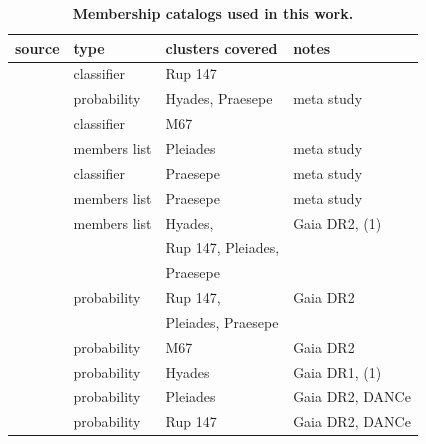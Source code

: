 \documentclass{aa}
\begin{document}
\begin{appendix}

\begin{table}
\caption{\textbf{Membership catalogs used in this work.}}
\label{tab:app:memberships}
\centering
\begin{tabular}{llll}     %
\hline\hline
     source  & type  & clusters covered & notes\\
\hline
   \citet{curtis_ruprecht_2013} & classifier & Rup 147 & \\
   \citet{douglas_praesepe_hyades_2014} & probability & Hyades, Praesepe & meta study \\
   \citet{gonzalez_m67mem_2016} & classifier & M67 & \\
   \citet{rebull_rotation_2016} & members list & Pleiades & meta study\\
   \citet{rebull_praesepe_2017} & classifier & Praesepe & meta study\\
   \citet{douglas_poking_2017} & members list & Praesepe & meta study\\
   \citet{gaia_dr2_2018_hrd} & members list & Hyades,   & Gaia DR2, (1)\\%
   &&Rup 147, Pleiades, &\\
   &&Praesepe&\\
   \citet{cantat_gaudin_2018} & probability & Rup 147, & Gaia DR2\\%
   && Pleiades, Praesepe&\\
   \citet{gao_m67mem_2018} & probability & M67 & Gaia DR2\\
   \citet{reino_hyades_2018} & probability & Hyades & Gaia DR1, (1)\\
   \citet{olivares_pleiades_2018} & probability & Pleiades & Gaia DR2, DANCe\\
   \citet{olivares_ngc6774_2019} & probability & Rup 147 & Gaia DR2, DANCe\\
\hline
\end{tabular}
\end{table}


\end{appendix}
\end{document}
